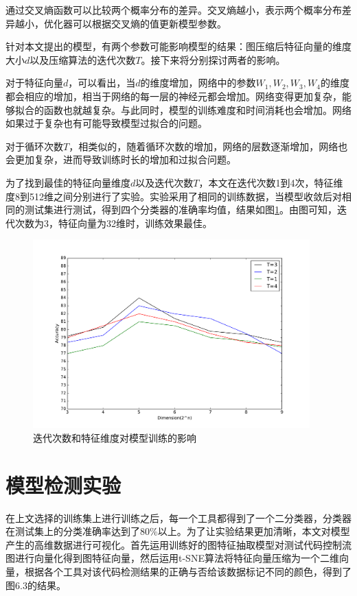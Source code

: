 通过交叉熵函数可以比较两个概率分布的差异。交叉熵越小，表示两个概率分布差异越小，优化器可以根据交叉熵的值更新模型参数。

针对本文提出的模型，有两个参数可能影响模型的结果：图压缩后特征向量的维度大小$d$以及压缩算法的迭代次数$T$。接下来将分别探讨两者的影响。


对于特征向量$d$，可以看出，当$d$的维度增加，网络中的参数$W_1, W_2, W_3, W_4$的维度都会相应的增加，相当于网络的每一层的神经元都会增加。网络变得更加复杂，能够拟合的函数也就越复杂。与此同时，模型的训练难度和时间消耗也会增加。网络如果过于复杂也有可能导致模型过拟合的问题。

对于循环次数$T$，相类似的，随着循环次数的增加，网络的层数逐渐增加，网络也会更加复杂，进而导致训练时长的增加和过拟合问题。

为了找到最佳的特征向量维度$d$以及迭代次数$T$，本文在迭代次数1到4次，特征维度8到512维之间分别进行了实验。实验采用了相同的训练数据，当模型收敛后对相同的测试集进行测试，得到四个分类器的准确率均值，结果如图\ref{mid}。由图可知，迭代次数为3，特征向量为32维时，训练效果最佳。
\begin{figure}[htbp]
	\begin{center}
		\includegraphics[width=0.95\textwidth]{figures/9.pdf}
		\caption{迭代次数和特征维度对模型训练的影响}
		\label{mid}
	\end{center}
\end{figure}
\section{模型检测实验}
在上文选择的训练集上进行训练之后，每一个工具都得到了一个二分类器，分类器在测试集上的分类准确率达到了80\%以上。为了让实验结果更加清晰，本文对模型产生的高维数据进行可视化。首先运用训练好的图特征抽取模型对测试代码控制流图进行向量化得到图特征向量，然后运用t-SNE算法将特征向量压缩为一个二维向量，根据各个工具对该代码检测结果的正确与否给该数据标记不同的颜色，得到了图6.3的结果。

